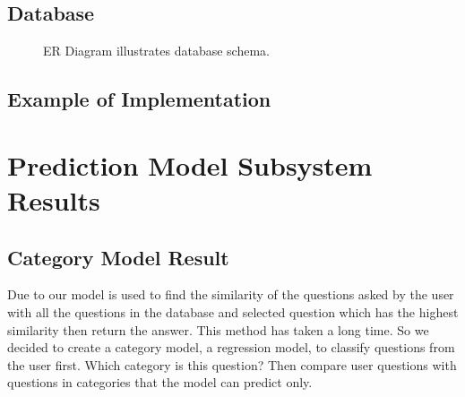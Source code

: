 \documentclass[12pt,oneside,openright,a4paper]{cpe-english-project}
\begin{document}
\subsection{Database}
\begin{figure}[!h]\centering
{}
\caption{ER Diagram illustrates database schema.
}\label{fig:ER Diagram illustrates database schema in result.}
\end{figure}
\subsection{Example of Implementation}


\section{Prediction Model Subsystem Results}
\subsection{Category Model Result}
Due to our model is used to find the similarity of the questions asked by the user with all the questions in the database and selected question which has the highest similarity then return the answer. This method has taken a long time. So we decided to create a category model, a regression model, to classify questions from the user first. Which category is this question? Then compare user questions with questions in categories that the model can predict only.
\end{document}
